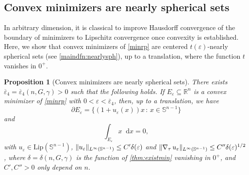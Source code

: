 \documentclass[JEP,XML,SOM,Unicode,published]{cedram}
\newcommand{\sep}{\,:\,}
\numberwithin{equation}{section}
\theoremstyle{plain}
\newtheorem{prp}[thm]{Proposition}
\theoremstyle{definition}
\newcommand{\numberset}[1]{{\mathbb{#1}}}
\newcommand{\R}{\numberset{R}}
\newcommand{\dx}{\mathop{}\mathopen{}\mathrm{d}x}
\newcommand{\bbS}{\mathbb{S}}
\let\eps\varepsilon
\let\ol\overline
\newcommand{\Ren}{{\R^n}}
\newcommand{\Lip}{{\mathrm{Lip}}}
\newcommand{\grad}{\nabla}
\newcommand{\subsq}{\subseteq}
\DeclarePairedDelimiter{\norm}{\lVert}{\rVert}
\begin{document}
\subsection{Convex minimizers are nearly spherical sets}\label{subsec:convnearlysph}

In arbitrary dimension, it is classical to improve Hausdorff convergence of the boundary of
minimizers to Lipschitz convergence once convexity is established.
Here, we show that convex minimizers of \cref{minrp} are centered $t(\eps)$-nearly spherical sets
(see \cref{maindfn:nearlysph}), up to a translation, where the function $t$ vanishes in $0^+$.

\begin{prp}[Convex minimizers are nearly spherical sets]\label{prp:minsph}
There exists $\ol{\eps}_4=\ol{\eps}_4(n,G,\gamma)>0$ such that the following holds.
If $E_\eps\subsq\Ren$ is a convex minimizer of \cref{minrp} with $0<\eps<\ol{\eps}_4$, then, up to
a translation, we have
\[
\partial E_\eps=\bigl\{ (1+u_\eps(x))x \sep  x\in\bbS^{n-1} \bigr\}
\]
and
\[
\int_{E_\eps} x\dx = 0,
\]
with $u_\eps\in \Lip(\bbS^{n-1})$, $\norm{u_\eps}_{L^\infty(\bbS^{n-1})}\leq C'\delta(\eps)$ and
$\norm{\grad_\tau\, u_\eps}_{L^\infty(\bbS^{n-1})}\leq C''\delta(\eps)^{1/2}$, where
$\delta=\delta(n,G,\gamma)$ is the function of \cref{thm:existmin} vanishing in $0^+$, and
$C',C''>0$ only depend on $n$.
\end{prp}
\end{document}
